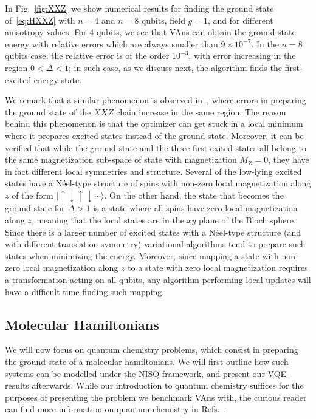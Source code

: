 In Fig.~\ref{fig:XXZ} we show numerical results for finding the ground state of~\eqref{eq:HXXZ} with $n=4$ and $n=8$ qubits, field $g=1$, and for different anisotropy values. For $4$ qubits, we see that VAns can obtain the ground-state energy with relative errors which are always smaller than $9\times 10^{-7}$. In the $n=8$ qubits case, the relative error is of the order $10^{-3}$, with error increasing in the region $0<\Delta<1$; in such case, as we discuss next, the algorithm finds the first-excited energy state.

We remark that a similar phenomenon is observed in~\cite{cervera2020meta}, where errors in preparing the ground state of the $XXZ$ chain increase in the same region. The reason behind this phenomenon is that the optimizer can get stuck in a local minimum where it prepares excited states instead of the ground state. Moreover, it can be verified that while the ground state and the three first exited states all belong to the same magnetization sub-space of state with magnetization $M_Z=0$, they have in fact different local symmetries and structure. Several of the low-lying excited states have a N\'eel-type structure of spins with non-zero local magnetization along $z$ of the form $|\uparrow\downarrow\uparrow\downarrow\cdots\rangle$. On the other hand, the state that becomes the ground-state for $\Delta>1$ is a state where all spins have zero local magnetization along $z$, meaning that the local states are in the $xy$ plane of the Bloch sphere. Since there is a larger number of excited states with a N\'eel-type structure (and with different translation symmetry) variational algorithms tend to prepare such states when minimizing the energy. Moreover, since mapping a state  with non-zero local magnetization along $z$ to a state with zero local magnetization requires a transformation acting on all qubits, any algorithm performing local updates will have a difficult time finding such mapping.



\afterpage{\clearpage}

%
\subsection{Molecular Hamiltonians}\label{ssec:molecular_ham_vans}
We will now focus on quantum chemistry problems, which consist in preparing the ground-state of a molecular hamiltonians. We will first outline how such systems can be modelled under the NISQ framework, and present our VQE-results afterwards. While our introduction to quantum chemistry suffices for the purposes of presenting the problem we benchmark VAns with, the curious reader can find more information on quantum chemistry in Refs.~\cite{RevModPhys.92.015003, mcclean2019openfermion,mcardle2020quantum}.

